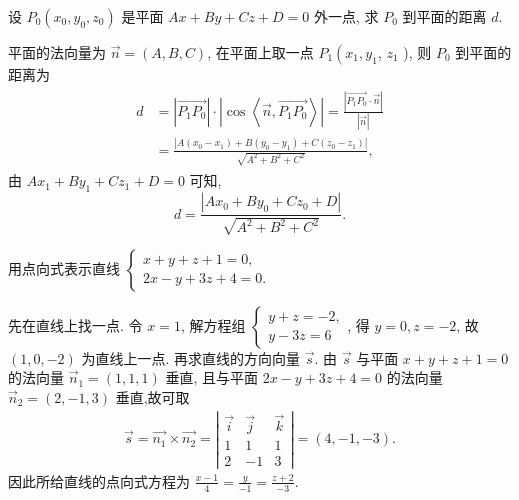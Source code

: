\begin{example}
	设 $P_0\left(x_0, y_0, z_0\right)$ 是平面 $A x+B y+C z+D=0$ 外一点, 求 $P_0$ 到平面的距离 $d$.
\end{example}
\begin{solution}
	平面的法向量为 $\vec{n}=(A, B, C)$, 在平面上取一点 $P_1\left(x_1, y_1\right.$, $z_1$ ), 则 $P_0$ 到平面的距离为
		\begin{align*}
			\begin{aligned}
				d & =\left|\overrightarrow{P_1 P_0}\right| \cdot\left|\cos \left\langle\vec{n}, \overrightarrow{P_1 P_0}\right\rangle\right|=\frac{\left|\overrightarrow{P_1 P_0} \cdot \vec{n}\right|}{|\vec{n}|} \\
				  & =\frac{\left|A\left(x_0-x_1\right)+B\left(y_0-y_1\right)+C\left(z_0-z_1\right)\right|}{\sqrt{A^2+B^2+C^2}},
			\end{aligned}
		\end{align*}
		由 $A x_1+B y_1+C z_1+D=0$ 可知,
	$$
		d=\frac{\left|A x_0+B y_0+C z_0+D\right|}{\sqrt{A^2+B^2+C^2}}.
	$$
\end{solution}

\begin{example}
	用点向式表示直线 $\left\{\begin{array}{l}x+y+z+1=0, \\ 2 x-y+3 z+4=0 .\end{array}\right.$
\end{example}
\begin{solution}
	先在直线上找一点.
	令 $x=1$, 解方程组 $\left\{\begin{array}{l}y+z=-2, \\ y-3 z=6\end{array}\right.$, 得 $y=0, z=-2$, 故 $(1,0,-2)$ 为直线上一点.
	再求直线的方向向量 $\vec{s}$.
	由 $\vec{s}$ 与平面 $x+y+z+1=0$ 的法向量 $\vec{n}_1=(1,1,1)$ 垂直, 且与平面 $2 x-y+3 z+4=0$ 的法向量 $\vec{n}_2=(2,-1,3)$ 垂直,故可取
	\begin{align*}
		\vec{s}=\overrightarrow{n_1} \times \overrightarrow{n_2}=\left|\begin{array}{ccc}
			                                                               \vec{i} & \vec{j} & \vec{k} \\
			                                                               1       & 1       & 1       \\
			                                                               2       & -1      & 3
		                                                               \end{array}\right|=(4,-1,-3) .
	\end{align*}
	因此所给直线的点向式方程为 $\frac{x-1}{4}=\frac{y}{-1}=\frac{z+2}{-3}$.
\end{solution}

